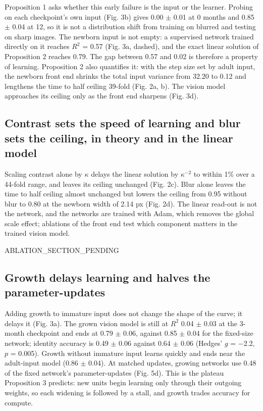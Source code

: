 \documentclass{article}
\begin{document}
Proposition 1 asks whether this early failure is the input or the learner. Probing on each checkpoint's own input (Fig. 3b) gives 0.00 \ensuremath{\pm} 0.01 at 0 months and 0.85 \ensuremath{\pm} 0.04 at 12, so it is not a distribution shift from training on blurred and testing on sharp images. The newborn input is not empty: a supervised network trained directly on it reaches \(R^2\) = 0.57 (Fig. 3a, dashed), and the exact linear solution of Proposition 2 reaches 0.79. The gap between 0.57 and 0.02 is therefore a property of learning. Proposition 2 also quantifies it: with the step size set by adult input, the newborn front end shrinks the total input variance from 32.20 to 0.12 and lengthens the time to half ceiling 39-fold (Fig. 2a, b). The vision model approaches its ceiling only as the front end sharpens (Fig. 3d).

\hypertarget{contrast-sets-the-speed-of-learning-and-blur-sets-the-ceiling-in-theory-and-in-the-linear-model}{%
\subsection{Contrast sets the speed of learning and blur sets the ceiling, in theory and in the linear model}\label{contrast-sets-the-speed-of-learning-and-blur-sets-the-ceiling-in-theory-and-in-the-linear-model}}

Scaling contrast alone by \(\kappa\) delays the linear solution by \(\kappa^{-2}\) to within 1\% over a 44-fold range, and leaves its ceiling unchanged (Fig. 2c). Blur alone leaves the time to half ceiling almost unchanged but lowers the ceiling from 0.95 without blur to 0.80 at the newborn width of 2.14 px (Fig. 2d). The linear read-out is not the network, and the networks are trained with Adam, which removes the global scale effect; ablations of the front end test which component matters in the trained vision model.

ABLATION\_SECTION\_PENDING

\hypertarget{growth-delays-learning-and-halves-the-parameter-updates}{%
\subsection{Growth delays learning and halves the parameter-updates}\label{growth-delays-learning-and-halves-the-parameter-updates}}

Adding growth to immature input does not change the shape of the curve; it delays it (Fig. 3a). The grown vision model is still at \(R^2\) 0.04 \ensuremath{\pm} 0.03 at the 3-month checkpoint and ends at 0.79 \ensuremath{\pm} 0.06, against 0.85 \ensuremath{\pm} 0.04 for the fixed-size network; identity accuracy is 0.49 \ensuremath{\pm} 0.06 against 0.64 \ensuremath{\pm} 0.06 (Hedges' \(g\) = \ensuremath{-}2.2, \(p\) = 0.005). Growth without immature input learns quickly and ends near the adult-input model (0.86 \ensuremath{\pm} 0.04). At matched updates, growing networks use 0.48 of the fixed network's parameter-updates (Fig. 5d). This is the plateau Proposition 3 predicts: new units begin learning only through their outgoing weights, so each widening is followed by a stall, and growth trades accuracy for compute.
\end{document}
